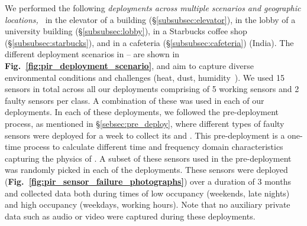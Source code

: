 We performed the following \emph{deployments across multiple scenarios and geographic locations,~\viz}  
\ca in the elevator of a building (\S\ref{subsubsec:elevator}), 
\cb in the lobby of a university building (\S\ref{subsubsec:lobby}), \cc in a Starbucks coffee shop (\S\ref{subsubsec:starbucks}), and \cd in a cafeteria (\S\ref{subsubsec:cafeteria}) (India).
The different deployment scenarios in \ca -- \cc are shown in {\bfseries Fig.~\ref{fig:pir_deployment_scenario}}, and aim to capture diverse environmental conditions and challenges (heat, dust, humidity~\etc).
We used 15 sensors in total across all our deployments comprising of 5 working sensors and 2 faulty sensors per class. A combination of these was used in each of our deployments. In each of these deployments, we followed the pre-deployment process, as mentioned in \S\ref{sebsec:pre_deploy}, where different types of faulty sensors were deployed for a week to collect its \aout and \cout. This pre-deployment is a one-time process to calculate different time and frequency domain characteristics capturing the physics of \aout. A subset of these sensors used in the pre-deployment was randomly picked in each of the deployments.
These sensors were deployed (\textbf{Fig.~\ref{fig:pir_sensor_failure_photographs}}) %
over a duration of 3 months and collected data both during times of low occupancy (weekends, late nights) and high occupancy (weekdays, working hours). Note that no auxiliary private data such as audio or video were captured during these deployments. 

